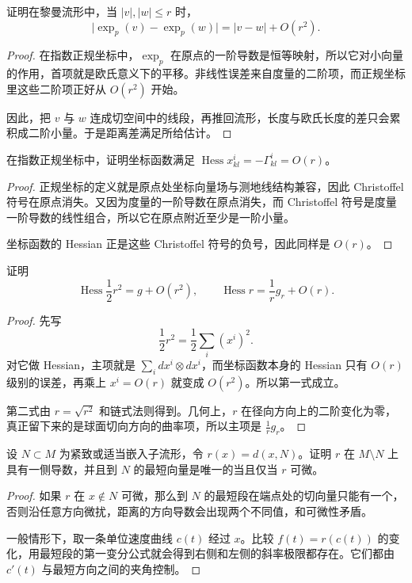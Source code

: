 \documentclass[11pt,a4paper,openany]{ctexbook}
\numberwithin{equation}{chapter}
\begin{document}
\begin{exercise}
证明在黎曼流形中，当 \(|v|,|w|\le r\) 时，
\[
\bigl| \exp_p(v)-\exp_p(w)\bigr| = |v-w| + O(r^2).
\]
\end{exercise}
\begin{proof}
在指数正规坐标中，\(\exp_p\) 在原点的一阶导数是恒等映射，所以它对小向量的作用，首项就是欧氏意义下的平移。非线性误差来自度量的二阶项，而正规坐标里这些二阶项正好从 \(O(r^2)\) 开始。

因此，把 \(v\) 与 \(w\) 连成切空间中的线段，再推回流形，长度与欧氏长度的差只会累积成二阶小量。于是距离差满足所给估计。
\end{proof}

\begin{exercise}
在指数正规坐标中，证明坐标函数满足 \(\operatorname{Hess}x^i_{kl}=-\Gamma^i_{kl}=O(r)\)。
\end{exercise}
\begin{proof}
正规坐标的定义就是原点处坐标向量场与测地线结构兼容，因此 Christoffel 符号在原点消失。又因为度量的一阶导数在原点消失，而 Christoffel 符号是度量一阶导数的线性组合，所以它在原点附近至少是一阶小量。

坐标函数的 Hessian 正是这些 Christoffel 符号的负号，因此同样是 \(O(r)\)。
\end{proof}

\begin{exercise}
证明
\[
\operatorname{Hess}\frac12 r^2 = g + O(r^2),\qquad
\operatorname{Hess} r = \frac1r g_r + O(r).
\]
\end{exercise}
\begin{proof}
先写
\[
\frac12 r^2=\frac12\sum_i (x^i)^2.
\]
对它做 Hessian，主项就是 \(\sum_i dx^i\otimes dx^i\)，而坐标函数本身的 Hessian 只有 \(O(r)\) 级别的误差，再乘上 \(x^i=O(r)\) 就变成 \(O(r^2)\)。所以第一式成立。

第二式由 \(r=\sqrt{r^2}\) 和链式法则得到。几何上，\(r\) 在径向方向上的二阶变化为零，真正留下来的是球面切向方向的曲率项，所以主项是 \(\frac1r g_r\)。
\end{proof}

\begin{exercise}
设 \(N\subset M\) 为紧致或适当嵌入子流形，令 \(r(x)=d(x,N)\)。证明 \(r\) 在 \(M\setminus N\) 上具有一侧导数，并且到 \(N\) 的最短向量是唯一的当且仅当 \(r\) 可微。
\end{exercise}
\begin{proof}
如果 \(r\) 在 \(x\notin N\) 可微，那么到 \(N\) 的最短段在端点处的切向量只能有一个，否则沿任意方向微扰，距离的方向导数会出现两个不同值，和可微性矛盾。

一般情形下，取一条单位速度曲线 \(c(t)\) 经过 \(x\)。比较 \(f(t)=r(c(t))\) 的变化，用最短段的第一变分公式就会得到右侧和左侧的斜率极限都存在。它们都由 \(c'(t)\) 与最短方向之间的夹角控制。
\end{proof}
\end{document}
